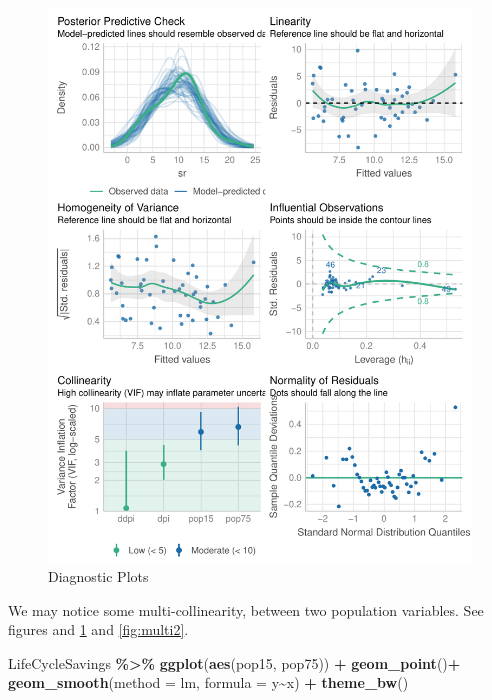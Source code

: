\documentclass[
]{book}
\newenvironment{Shaded}{\begin{snugshade}}{\end{snugshade}}
\newcommand{\AttributeTok}[1]{\textcolor[rgb]{0.13,0.29,0.53}{#1}}
\newcommand{\FunctionTok}[1]{\textcolor[rgb]{0.13,0.29,0.53}{\textbf{#1}}}
\newcommand{\NormalTok}[1]{#1}
\newcommand{\SpecialCharTok}[1]{\textcolor[rgb]{0.81,0.36,0.00}{\textbf{#1}}}
\newcommand{\StringTok}[1]{\textcolor[rgb]{0.31,0.60,0.02}{#1}}
\begin{document}
\begin{figure}

{\centering \includegraphics{DauR_files/figure-latex/perf2-1} 

}

\caption{Diagnostic Plots}\label{fig:perf2}
\end{figure}

We may notice some multi-collinearity, between two population variables. See figures and \ref{fig:perf2} and \ref{fig:multi2}.

\begin{Shaded}
\begin{Highlighting}[]
\NormalTok{LifeCycleSavings }\SpecialCharTok{\%\textgreater{}\%} 
  \FunctionTok{ggplot}\NormalTok{(}\FunctionTok{aes}\NormalTok{(pop15, pop75)) }\SpecialCharTok{+}
  \FunctionTok{geom\_point}\NormalTok{()}\SpecialCharTok{+}
  \FunctionTok{geom\_smooth}\NormalTok{(}\AttributeTok{method =} \StringTok{\textquotesingle{}lm\textquotesingle{}}\NormalTok{, }\AttributeTok{formula =} \StringTok{\textquotesingle{}y\textasciitilde{}x\textquotesingle{}}\NormalTok{) }\SpecialCharTok{+}
  \FunctionTok{theme\_bw}\NormalTok{()}
\end{Highlighting}
\end{Shaded}
\end{document}
